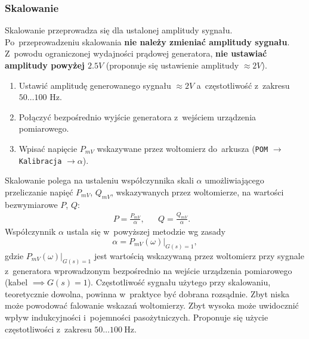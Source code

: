 \documentclass[paper=a4,DIV=12]{lpas}
\begin{document}
\subsubsection{Skalowanie}
\label{sec:XW8AC}

Skalowanie przeprowadza się dla ustalonej amplitudy sygnału. Po~przeprowadzeniu
skalowania \textbf{nie należy zmieniać amplitudy sygnału}. Z~powodu
ograniczonej wydajności prądowej generatora, \textbf{nie ustawiać amplitudy
powyżej $2.5V$} (proponuje się ustawienie amplitudy $\approx 2V$).
\begin{enumerate}
  \item Ustawić amplitudę generowanego sygnału $\approx 2V$ a~częstotliwość
    z~zakresu $50\dots100\text{ Hz}$.
  \item Połączyć bezpośrednio wyjście generatora z~wejściem urządzenia
    pomiarowego.
  \item Wpisać napięcie $P_{mV}$ wskazywane przez woltomierz do~arkusza
    (\texttt{POM} $\rightarrow$ \texttt{Kalibracja} $\rightarrow \alpha$).
\end{enumerate}

Skalowanie polega na ustaleniu współczynnika skali $\alpha$ umożliwiającego
przeliczanie napięć $P_{mV}$, $Q_{mV}$, wskazywanych przez woltomierze, na
wartości bezwymiarowe $P$, $Q$:
\begin{equation}
  \begin{aligned}
    & P = \frac{P_{mV}}{\alpha}, && Q = \frac{Q_{mV}}{\alpha}. &&
  \end{aligned}
  \label{eq:IP4D4}
\end{equation}
Współczynnik $\alpha$ ustala się w~powyższej metodzie wg zasady
\begin{equation}
  \alpha = \left.P_{mV}(\omega)\right|_{G(s) = 1},
  \label{eq:57L58}
\end{equation}
gdzie $\left.P_{mV}(\omega)\right|_{G(s) = 1}$ jest wartością wskazywaną przez
woltomierz przy sygnale z~generatora wprowadzonym bezpośrednio na wejście
urządzenia pomiarowego (kabel $\implies G(s) = 1$). Częstotliwość sygnału
użytego przy skalowaniu, teoretycznie dowolna, powinna w~praktyce być dobrana
rozsądnie. Zbyt niska może powodować falowanie wskazań woltomierzy. Zbyt wysoka
może uwidocznić wpływ indukcyjności i~pojemności pasożytniczych. Proponuje się
użycie częstotliwości z~zakresu $50\dots100~\text{Hz}$.
\end{document}
